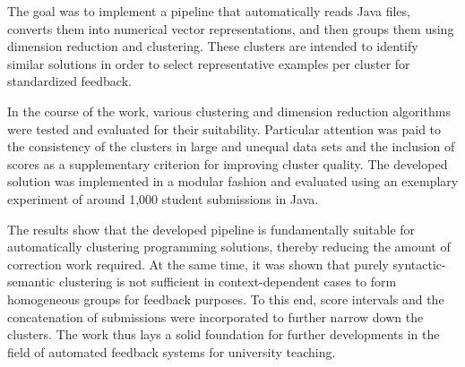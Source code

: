 The goal was to implement a pipeline that automatically reads Java files, converts them into numerical vector representations, and then groups them using dimension reduction and clustering. These clusters are intended to identify similar solutions in order to select representative examples per cluster for standardized feedback.

In the course of the work, various clustering and dimension reduction algorithms were tested and evaluated for their suitability. Particular attention was paid to the consistency of the clusters in large and unequal data sets and the inclusion of scores as a supplementary criterion for improving cluster quality. The developed solution was implemented in a modular fashion and evaluated using an exemplary experiment of around 1,000 student submissions in Java.

The results show that the developed pipeline is fundamentally suitable for automatically clustering programming solutions, thereby reducing the amount of correction work required. At the same time, it was shown that purely syntactic-semantic clustering is not sufficient in context-dependent cases to form homogeneous groups for feedback purposes. To this end, score intervals and the concatenation of submissions were incorporated to further narrow down the clusters. The work thus lays a solid foundation for further developments in the field of automated feedback systems for university teaching.
